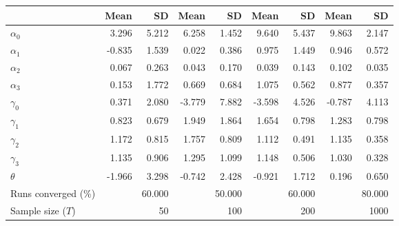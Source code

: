 
\begin{tabular}[t]{lrrrrrrrr}
\toprule
  & Mean & SD & Mean  & SD  & Mean   & SD   & Mean    & SD   \\
\midrule
$\alpha_{0}$ & 3.296 & 5.212 & 6.258 & 1.452 & 9.640 & 5.437 & 9.863 & 2.147\\
$\alpha_{1}$ & -0.835 & 1.539 & 0.022 & 0.386 & 0.975 & 1.449 & 0.946 & 0.572\\
$\alpha_{2}$ & 0.067 & 0.263 & 0.043 & 0.170 & 0.039 & 0.143 & 0.102 & 0.035\\
$\alpha_{3}$ & 0.153 & 1.772 & 0.669 & 0.684 & 1.075 & 0.562 & 0.877 & 0.357\\
$\gamma_{0}$ & 0.371 & 2.080 & -3.779 & 7.882 & -3.598 & 4.526 & -0.787 & 4.113\\
$\gamma_{1}$ & 0.823 & 0.679 & 1.949 & 1.864 & 1.654 & 0.798 & 1.283 & 0.798\\
$\gamma_{2}$ & 1.172 & 0.815 & 1.757 & 0.809 & 1.112 & 0.491 & 1.135 & 0.358\\
$\gamma_{3}$ & 1.135 & 0.906 & 1.295 & 1.099 & 1.148 & 0.506 & 1.030 & 0.328\\
$\theta$ & -1.966 & 3.298 & -0.742 & 2.428 & -0.921 & 1.712 & 0.196 & 0.650\\
Runs converged (\%) &  & 60.000 &  & 50.000 &  & 60.000 &  & 80.000\\
Sample size ($T$) &  & 50 &  & 100 &  & 200 &  & 1000\\
\bottomrule
\end{tabular}
